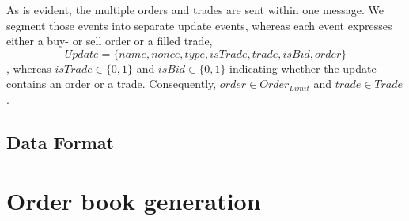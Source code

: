 As is evident, the multiple orders and trades are sent within one message. 
We segment those events into separate update events, whereas each event expresses either a buy- or sell order or a filled trade,
\begin{equation}
    Update = \{name, nonce, type, isTrade, trade, isBid, order\}
\end{equation}
, whereas $isTrade \in \{0,1\}$ and $isBid \in \{0,1\}$ indicating whether the update contains an order or a trade. 
Consequently, $order \in Order_{Limit}$ and $trade \in Trade$.

\subsection{Data Format}


\section{Order book generation}
